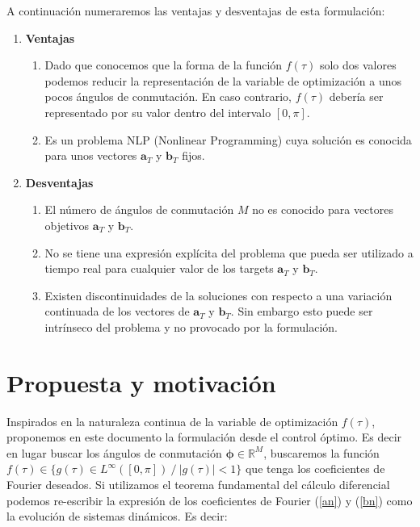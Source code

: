 A continuación numeraremos las ventajas y desventajas de esta formulación:


\begin{enumerate}
    \item \textbf{Ventajas} 
    \begin{enumerate}
        \item Dado que conocemos que la forma de la función $f(\tau)$ solo dos valores podemos reducir la representación de la variable de optimización a unos pocos ángulos de conmutación. En caso contrario, $f(\tau)$ debería ser representado por su valor dentro del intervalo $[0,\pi]$.
        \item Es un problema NLP (Nonlinear Programming) cuya solución es conocida para unos vectores $\bm{a}_T$ y $\bm{b}_T$ fijos.
    \end{enumerate}
    \item \textbf{Desventajas}
    \begin{enumerate}
        \item El número de ángulos de conmutación $M$ no es conocido para vectores objetivos $\bm{a}_T$ y $\bm{b}_T$.
        \item No se tiene una expresión explícita del problema que pueda ser utilizado a tiempo real para cualquier valor de los targets $\bm{a}_T$ y $\bm{b}_T$.
        \item Existen discontinuidades de la soluciones con respecto a una variación continuada de los vectores de $\bm{a}_T$ y $\bm{b}_T$. Sin embargo esto puede ser intrínseco del problema y no provocado por la formulación.
    \end{enumerate} 
\end{enumerate}


\section{Propuesta y motivación}

Inspirados en la naturaleza continua de la variable de optimización $f(\tau)$, proponemos en este documento la formulación desde el control óptimo. Es decir en lugar buscar los ángulos de conmutación $\bm{\phi} \in \mathbb{R}^M$, buscaremos la función $f(\tau) \in \{ g(\tau)  \in L^\infty([0,\pi])\ /\ |g(\tau)| < 1\} $ que tenga los coeficientes de Fourier deseados. Si utilizamos el  teorema fundamental del cálculo diferencial podemos re-escribir la expresión de los coeficientes de Fourier (\ref{an}) y (\ref{bn}) como la evolución de sistemas dinámicos. Es decir:

